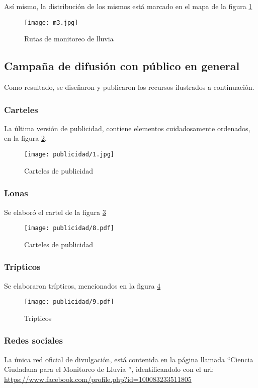 Así mismo, la distribución de los mismos está marcado en el mapa de la figura \ref{m3}

\begin{figure}[h!]
\centering
  \texttt{[image: m3.jpg]}
  \caption{Rutas de monitoreo de lluvia}
  \label{m3}
\end{figure}



\subsection{Campaña de difusión con público en general}
Como resultado, se diseñaron y publicaron los recursos ilustrados a continuación.


\subsubsection{Carteles}
La última versión de publicidad, contiene elementos cuidadosamente ordenados, en la figura \ref{publicidad1}.

\begin{figure}[h!]
\centering
  \texttt{[image: publicidad/1.jpg]}
  \caption{Carteles de publicidad}
  \label{publicidad1}
\end{figure}

\subsubsection{Lonas}
Se elaboró el cartel de la figura \ref{publicidad7}
\begin{figure}[h!]
\centering
  \texttt{[image: publicidad/8.pdf]}
  \caption{Carteles de publicidad}
  \label{publicidad7}
\end{figure}

\subsubsection{Trípticos}
Se elaboraron trípticos, mencionados en la figura \ref{publicidad9}
\begin{figure}[h!]
\centering
  \texttt{[image: publicidad/9.pdf]}
  \caption{Trípticos}
  \label{publicidad9}
\end{figure}

\subsubsection{Redes sociales}
La única red oficial de divulgación, está contenida en la página llamada ``Ciencia Ciudadana para el Monitoreo de Lluvia '', identificandolo con el url: \url{https://www.facebook.com/profile.php?id=100083233511805}

